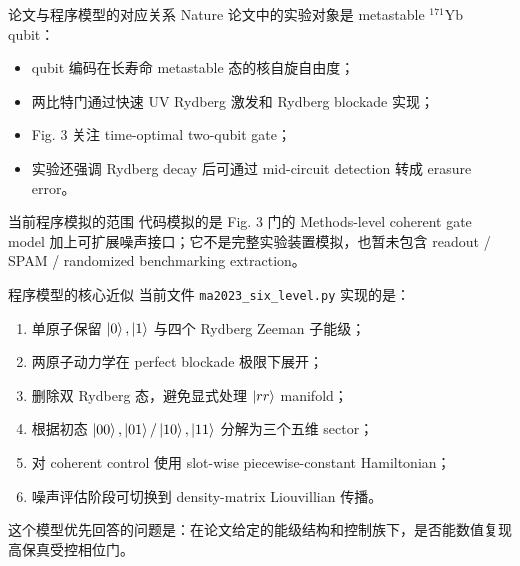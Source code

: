 \documentclass[aspectratio=169,11pt]{ctexbeamer}
\begin{document}
\begin{frame}{论文与程序模型的对应关系}
  Nature 论文中的实验对象是 metastable \({}^{171}\mathrm{Yb}\) qubit：
  \begin{itemize}
    \item qubit 编码在长寿命 metastable 态的核自旋自由度；
    \item 两比特门通过快速 UV Rydberg 激发和 Rydberg blockade 实现；
    \item Fig. 3 关注 time-optimal two-qubit gate；
    \item 实验还强调 Rydberg decay 后可通过 mid-circuit detection 转成 erasure error。
  \end{itemize}

  \begin{block}{当前程序模拟的范围}
    代码模拟的是 Fig. 3 门的 Methods-level coherent gate model 加上可扩展噪声接口；它不是完整实验装置模拟，也暂未包含 readout / SPAM / randomized benchmarking extraction。
  \end{block}
\end{frame}

\begin{frame}{程序模型的核心近似}
  当前文件 \texttt{ma2023\_six\_level.py} 实现的是：

  \begin{enumerate}
    \item 单原子保留 \(\ket{0},\ket{1}\) 与四个 Rydberg Zeeman 子能级；
    \item 两原子动力学在 perfect blockade 极限下展开；
    \item 删除双 Rydberg 态，避免显式处理 \(\ket{rr}\) manifold；
    \item 根据初态 \(\ket{00},\ket{01}/\ket{10},\ket{11}\) 分解为三个五维 sector；
    \item 对 coherent control 使用 slot-wise piecewise-constant Hamiltonian；
    \item 噪声评估阶段可切换到 density-matrix Liouvillian 传播。
  \end{enumerate}

  这个模型优先回答的问题是：在论文给定的能级结构和控制族下，是否能数值复现高保真受控相位门。
\end{frame}
\end{document}
